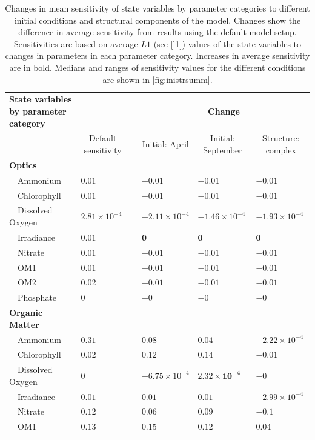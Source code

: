 \documentclass[letterpaper,12pt,oneside]{article}\usepackage[]{graphicx}\usepackage[]{color}
\begin{document}
\begin{table}[!tbp]
{\scriptsize
\caption{Changes in mean sensitivity of state variables by parameter categories to different initial conditions and structural components of the model.  Changes show the difference in average sensitivity from results using the default model setup. Sensitivities are based on average $L1$ (see \cref{l1}) values of the state variables to changes in parameters in each parameter category. Increases in average sensitivity are in bold. Medians and ranges of sensitivity values for the different conditions are shown in \cref{fig:inistrsumm}.\label{tab:inistrchg}} 
\begin{center}
\begin{tabular}{llclll}
\hline\hline
\multicolumn{1}{l}{\bfseries State variables by parameter category}&\multicolumn{1}{c}{\bfseries }&\multicolumn{1}{c}{\bfseries }&\multicolumn{3}{c}{\bfseries Change}\tabularnewline
\cline{4-6}
\multicolumn{1}{l}{}&\multicolumn{1}{c}{Default sensitivity}&\multicolumn{1}{c}{}&\multicolumn{1}{c}{Initial: April}&\multicolumn{1}{c}{Initial: September}&\multicolumn{1}{c}{Structure: complex}\tabularnewline
\hline
{\bfseries Optics}&&&&&\tabularnewline
~~Ammonium&$0.01$&&$-0.01$&$-0.01$&$-0.01$\tabularnewline
~~Chlorophyll&$0.01$&&$-0.01$&$-0.01$&$-0.01$\tabularnewline
~~Dissolved Oxygen&$2.81\times 10^{-4}$&&$-2.11\times 10^{-4}$&$-1.46\times 10^{-4}$&$-1.93\times 10^{-4}$\tabularnewline
~~Irradiance&$0.01$&&$\bm{0}$&$\bm{0}$&$\bm{0}$\tabularnewline
~~Nitrate&$0.01$&&$-0.01$&$-0.01$&$-0.01$\tabularnewline
~~OM1&$0.01$&&$-0.01$&$-0.01$&$-0.01$\tabularnewline
~~OM2&$0.02$&&$-0.01$&$-0.01$&$-0.01$\tabularnewline
~~Phosphate&$0$&&$-0$&$-0$&$-0$\tabularnewline
\hline
{\bfseries Organic Matter}&&&&&\tabularnewline
~~Ammonium&$0.31$&&$\bm{0.08}$&$\bm{0.04}$&$-2.22\times 10^{-4}$\tabularnewline
~~Chlorophyll&$0.02$&&$\bm{0.12}$&$\bm{0.14}$&$-0.01$\tabularnewline
~~Dissolved Oxygen&$0$&&$-6.75\times 10^{-4}$&$\bm{2.32\times 10^{-4}}$&$-0$\tabularnewline
~~Irradiance&$0.01$&&$\bm{0.01}$&$\bm{0.01}$&$-2.99\times 10^{-4}$\tabularnewline
~~Nitrate&$0.12$&&$\bm{0.06}$&$\bm{0.09}$&$-0.1$\tabularnewline
~~OM1&$0.13$&&$\bm{0.15}$&$\bm{0.12}$&$\bm{0.04}$\tabularnewline

\end{tabular}
\end{center}}
\end{table}
\end{document}
